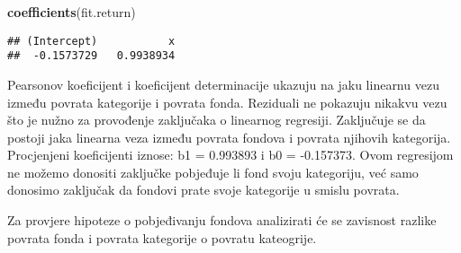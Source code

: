 \documentclass[
]{article}
\newenvironment{Shaded}{\begin{snugshade}}{\end{snugshade}}
\newcommand{\DataTypeTok}[1]{\textcolor[rgb]{0.13,0.29,0.53}{#1}}
\newcommand{\KeywordTok}[1]{\textcolor[rgb]{0.13,0.29,0.53}{\textbf{#1}}}
\newcommand{\NormalTok}[1]{#1}
\newcommand{\OperatorTok}[1]{\textcolor[rgb]{0.81,0.36,0.00}{\textbf{#1}}}
\newcommand{\StringTok}[1]{\textcolor[rgb]{0.31,0.60,0.02}{#1}}
\begin{document}
\begin{Shaded}
\begin{Highlighting}[]
\KeywordTok{coefficients}\NormalTok{(fit.return)}
\end{Highlighting}
\end{Shaded}

\begin{verbatim}
## (Intercept)           x 
##  -0.1573729   0.9938934
\end{verbatim}

Pearsonov koeficijent i koeficijent determinacije ukazuju na jaku
linearnu vezu između povrata kategorije i povrata fonda. Reziduali ne
pokazuju nikakvu vezu što je nužno za provođenje zaključaka o linearnog
regresiji. Zaključuje se da postoji jaka linearna veza između povrata
fondova i povrata njihovih kategorija. Procjenjeni koeficijenti iznose:
b1 = 0.993893 i b0 = -0.157373. Ovom regresijom ne možemo donositi
zaključke pobjeđuje li fond svoju kategoriju, već samo donosimo
zaključak da fondovi prate svoje kategorije u smislu povrata.

Za provjere hipoteze o pobjeđivanju fondova analizirati će se zavisnost
razlike povrata fonda i povrata kategorije o povratu kateogrije.

\begin{Shaded}
\end{Shaded}
\end{document}
